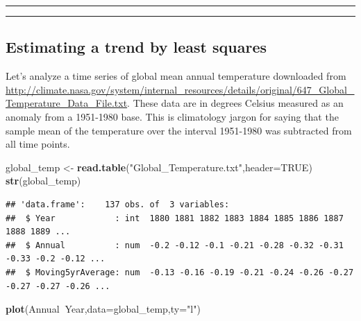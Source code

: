 \documentclass[]{article}
\newenvironment{Shaded}{\begin{snugshade}}{\end{snugshade}}
\newcommand{\KeywordTok}[1]{\textcolor[rgb]{0.13,0.29,0.53}{\textbf{#1}}}
\newcommand{\DataTypeTok}[1]{\textcolor[rgb]{0.13,0.29,0.53}{#1}}
\newcommand{\StringTok}[1]{\textcolor[rgb]{0.31,0.60,0.02}{#1}}
\newcommand{\OtherTok}[1]{\textcolor[rgb]{0.56,0.35,0.01}{#1}}
\newcommand{\OperatorTok}[1]{\textcolor[rgb]{0.81,0.36,0.00}{\textbf{#1}}}
\newcommand{\NormalTok}[1]{#1}
\begin{document}
\begin{center}\rule{0.5\linewidth}{\linethickness}\end{center}

\begin{center}\rule{0.5\linewidth}{\linethickness}\end{center}

\subsection{Estimating a trend by least
squares}\label{estimating-a-trend-by-least-squares}

Let's analyze a time series of global mean annual temperature downloaded
from
\url{http://climate.nasa.gov/system/internal_resources/details/original/647_Global_Temperature_Data_File.txt}.
These data are in degrees Celsius measured as an anomaly from a
1951-1980 base. This is climatology jargon for saying that the sample
mean of the temperature over the interval 1951-1980 was subtracted from
all time points.

\begin{Shaded}
\begin{Highlighting}[]
\NormalTok{global_temp <-}\StringTok{ }\KeywordTok{read.table}\NormalTok{(}\StringTok{"Global_Temperature.txt"}\NormalTok{,}\DataTypeTok{header=}\OtherTok{TRUE}\NormalTok{)}
\KeywordTok{str}\NormalTok{(global_temp)}
\end{Highlighting}
\end{Shaded}

\begin{verbatim}
## 'data.frame':    137 obs. of  3 variables:
##  $ Year            : int  1880 1881 1882 1883 1884 1885 1886 1887 1888 1889 ...
##  $ Annual          : num  -0.2 -0.12 -0.1 -0.21 -0.28 -0.32 -0.31 -0.33 -0.2 -0.12 ...
##  $ Moving5yrAverage: num  -0.13 -0.16 -0.19 -0.21 -0.24 -0.26 -0.27 -0.27 -0.27 -0.26 ...
\end{verbatim}

\begin{Shaded}
\begin{Highlighting}[]
\KeywordTok{plot}\NormalTok{(Annual}\OperatorTok{~}\NormalTok{Year,}\DataTypeTok{data=}\NormalTok{global_temp,}\DataTypeTok{ty=}\StringTok{"l"}\NormalTok{)}
\end{Highlighting}
\end{Shaded}
\end{document}
